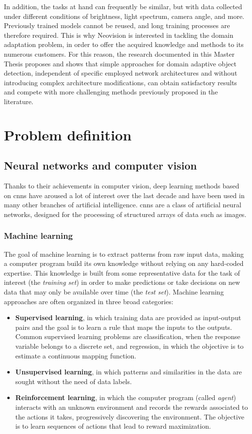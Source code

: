 \documentclass[%
    corpo=12pt,
    twoside,
    stile=classica,   
    tipotesi=magistrale,
    evenboxes,
    english,
	numerazioneromana,
]{toptesi}
\begin{document}
In addition, the tasks at hand can frequently be similar, but with data collected under different conditions of brightness, light spectrum, camera angle, and more. Previously trained models cannot be reused, and long training processes are therefore required. This is why Neovision is interested in tackling the domain adaptation problem, in order to offer the acquired knowledge and methods to its numerous customers. For this reason, the research documented in this Master Thesis proposes and shows that simple approaches for domain adaptive object detection, independent of specific employed network architectures and without introducing complex architecture modifications, can obtain satisfactory results and compete with more challenging methods previously proposed in the literature.


\chapter{Problem definition}
\section{Neural networks and computer vision}
Thanks to their achievements in computer vision, deep learning methods based on \glspl{cnn} have aroused a lot of interest over the last decade and have been used in many other branches of artificial intelligence. \Glspl{cnn} are a class of artificial neural networks, designed for the processing of structured arrays of data such as images.

\subsection{Machine learning}
The goal of machine learning is to extract patterns from raw input data, making a computer program build its own knowledge without relying on any hard-coded expertise. This knowledge is built from some representative data for the task of interest (the \textit{training set}) in order to make predictions or take decisions on new data that may only be available over time (the \textit{test set}). Machine learning approaches are often organized in three broad categories:

\begin{itemize}
	\item \textbf{Supervised learning}, in which training data are provided as input-output pairs and the goal is to learn a rule that maps the inputs to the outputs. Common supervised learning problems are classification, when the response variable belongs to a discrete set, and regression, in which the objective is to estimate a continuous mapping function.
	\item \textbf{Unsupervised learning}, in which patterns and similarities in the data are sought without the need of data labels.
	\item \textbf{Reinforcement learning}, in which the computer program (called \textit{agent}) interacts with an unknown environment and records the rewards associated to the actions it takes, progressively discovering the environment. The objective is to learn sequences of actions that lead to reward maximization.
\end{itemize}
\end{document}
